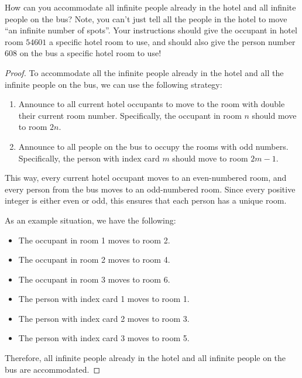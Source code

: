 \documentclass{article}
\begin{document}
\begin{enumerate}
          How can you accommodate all infinite people already in the hotel and all
          infinite people on the bus? Note, you can't just tell all the people in the
          hotel to move ``an infinite number of spots''. Your instructions should give
          the occupant in hotel room $54601$ a specific hotel room to use, and should
          also give the person number $608$ on the bus a specific hotel room to use!

          \begin{proof}
              To accommodate all the infinite people already in the hotel and all the infinite people on the bus, we can use the following strategy:
              \begin{enumerate}[label=\arabic*.]
                  \item Announce to all current hotel occupants to move to the room with double their
                        current room number. Specifically, the occupant in room $n$ should move to room
                        $2n$.
                  \item Announce to all people on the bus to occupy the rooms with odd numbers.
                        Specifically, the person with index card $m$ should move to room $2m-1$.
              \end{enumerate}
              This way, every current hotel occupant moves to an even-numbered room, and every person from the bus moves to an odd-numbered room. Since every positive integer is either even or odd, this ensures that each person has a unique room.

              As an example situation, we have the following:
              \begin{itemize}
                  \item The occupant in room 1 moves to room 2.
                  \item The occupant in room 2 moves to room 4.
                  \item The occupant in room 3 moves to room 6.
                  \item The person with index card 1 moves to room 1.
                  \item The person with index card 2 moves to room 3.
                  \item The person with index card 3 moves to room 5.
              \end{itemize}
              Therefore, all infinite people already in the hotel and all infinite people on the bus are accommodated.
          \end{proof}

\end{enumerate}
\end{document}
